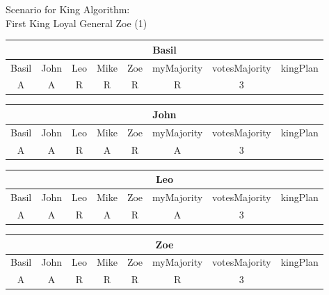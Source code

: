 \begin{wideslide}[bm=,toc=]{\large Scenario for King Algorithm:\\First King Loyal General Zoe (1)}
\begin{center}
\begin{paenv}

\begin{tabular}{|c|c|c|c|c||c|c|c|}
\hline
\multicolumn{8}{|c|}{Basil}\\\hline
Basil & John & Leo & Mike & Zoe & myMajority & votesMajority & kingPlan \\\hline
A&A&R&R&R&R&3&\\\hline
\end{tabular}
\smallskip

\begin{tabular}{|c|c|c|c|c||c|c|c|}
\hline
\multicolumn{8}{|c|}{John}\\\hline
Basil & John & Leo & Mike & Zoe & myMajority & votesMajority & kingPlan \\\hline
A&A&R&A&R&A&3&\\\hline
\end{tabular}
\smallskip

\begin{tabular}{|c|c|c|c|c||c|c|c|}
\hline
\multicolumn{8}{|c|}{Leo}\\\hline
Basil & John & Leo & Mike & Zoe & myMajority & votesMajority & kingPlan \\\hline
A&A&R&A&R&A&3&\\\hline
\end{tabular}
\smallskip

\begin{tabular}{|c|c|c|c|c||c|c|c|}
\hline
\multicolumn{8}{|c|}{Zoe}\\\hline
Basil & John & Leo & Mike & Zoe & myMajority & votesMajority & kingPlan \\\hline
A&A&R&R&R&R&3&\\\hline
\end{tabular}
\end{paenv}
\end{center}
\end{wideslide}

